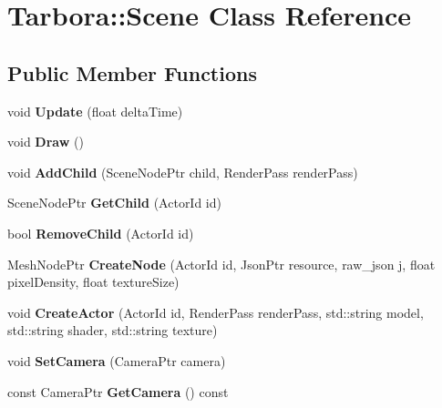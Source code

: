 \hypertarget{classTarbora_1_1Scene}{}\section{Tarbora\+:\+:Scene Class Reference}
\label{classTarbora_1_1Scene}
\subsection*{Public Member Functions}
\begin{DoxyCompactItemize}
\item 
\mbox{\label{classTarbora_1_1Scene_a7e04a725cf3d429857ac172aaa1b879c}} 
void {\bfseries Update} (float delta\+Time)
\item 
\mbox{\label{classTarbora_1_1Scene_a29a7a8845364aaa76db679d4e58f70ed}} 
void {\bfseries Draw} ()
\item 
\mbox{\label{classTarbora_1_1Scene_a8335dd180437f99af5fb342bf8c9f6a6}} 
void {\bfseries Add\+Child} (Scene\+Node\+Ptr child, Render\+Pass render\+Pass)
\item 
\mbox{\label{classTarbora_1_1Scene_ae982863daedcd9c94c06c6a484883789}} 
Scene\+Node\+Ptr {\bfseries Get\+Child} (Actor\+Id id)
\item 
\mbox{\label{classTarbora_1_1Scene_ad3967c71f11edcc32bc8d2a7d8abbe62}} 
bool {\bfseries Remove\+Child} (Actor\+Id id)
\item 
\mbox{\label{classTarbora_1_1Scene_a08b677a81a817563f7c4116277055d86}} 
Mesh\+Node\+Ptr {\bfseries Create\+Node} (Actor\+Id id, Json\+Ptr resource, raw\+\_\+json j, float pixel\+Density, float texture\+Size)
\item 
\mbox{\label{classTarbora_1_1Scene_a2533d3656c2601dc955e5f54e89b7e38}} 
void {\bfseries Create\+Actor} (Actor\+Id id, Render\+Pass render\+Pass, std\+::string model, std\+::string shader, std\+::string texture)
\item 
\mbox{\label{classTarbora_1_1Scene_aaf0eb31b7de572adae21cb39d3f58f02}} 
void {\bfseries Set\+Camera} (Camera\+Ptr camera)
\item 
\mbox{\label{classTarbora_1_1Scene_a0e4d814a2fb7422dbdcfeebde985fdf7}} 
const Camera\+Ptr {\bfseries Get\+Camera} () const
\end{DoxyCompactItemize}
